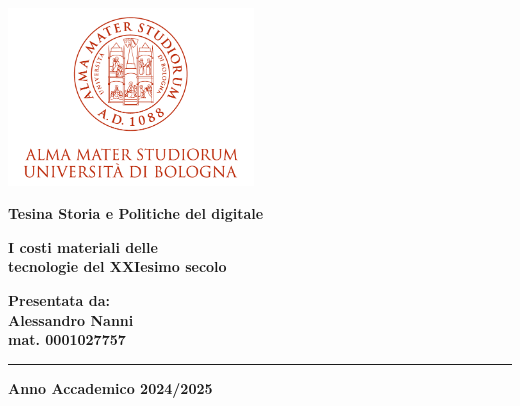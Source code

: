 \documentclass[12pt,a4paper,oneside]{book}
\begin{document}
\pagestyle{empty}

\begin{titlepage}

\begin{center}

\includegraphics[width=6.5cm,height=4.7cm]{img/marchio-di-ateneo.png}

\vspace{15mm}


{\Large{\bf{Tesina Storia e Politiche del digitale}}}

\vspace{15mm}

{\Huge{\bf I costi materiali delle }}\\
\vspace{3mm}
{\Huge{\bf tecnologie del XXIesimo secolo}}\\
\vspace{3mm}
\end{center}

\vspace{20mm}

\hfill
\begin{minipage}[t]{0.40\textwidth}\raggedleft
{\Large{\bf Presentata da: \\ Alessandro Nanni \\ mat. 
 0001027757}}
\end{minipage}

\vspace{90mm}

\rule[0.5cm]{15.8cm}{0.6mm}

\begin{center}
{\large{\bf Anno Accademico 2024/2025\\}}
\end{center}

\end{titlepage}
\end{document}
